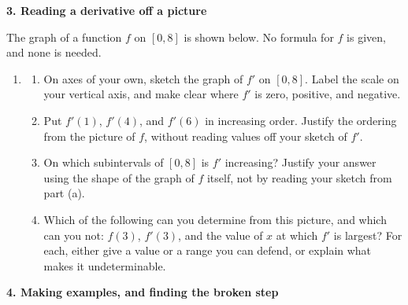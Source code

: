 \documentclass[11pt]{article}
\newcommand{\gridxy}[4]{%
  \foreach \gX in {#1,...,#2} \draw[gray!25] (\gX,#3) -- (\gX,#4);
  \foreach \gY in {#3,...,#4} \draw[gray!25] (#1,\gY) -- (#2,\gY);}
\newcommand{\prob}[1]{\medskip\noindent\textbf{\large #1}\par\smallskip}
\begin{document}
\newpage
\prob{3. Reading a derivative off a picture}

The graph of a function $f$ on $[0,8]$ is shown below. No formula for $f$ is given,
and none is needed.

\smallskip
\begin{center}
\end{center}

\begin{enumerate}[resume]
\item[]
\begin{enumerate}
\item On axes of your own, sketch the graph of $f'$ on $[0,8]$. Label the scale on
your vertical axis, and make clear where $f'$ is zero, positive, and negative.

\item Put $f'(1)$, $f'(4)$, and $f'(6)$ in increasing order. Justify the ordering
from the picture of $f$, without reading values off your sketch of $f'$.

\item On which subintervals of $[0,8]$ is $f'$ increasing? Justify your answer using
the shape of the graph of $f$ itself, not by reading your sketch from part (a).

\item Which of the following can you determine from this picture, and which can you
not: $f(3)$, $f'(3)$, and the value of $x$ at which $f'$ is largest? For each, either
give a value or a range you can defend, or explain what makes it undeterminable.
\end{enumerate}
\end{enumerate}

\prob{4. Making examples, and finding the broken step}
\end{document}
